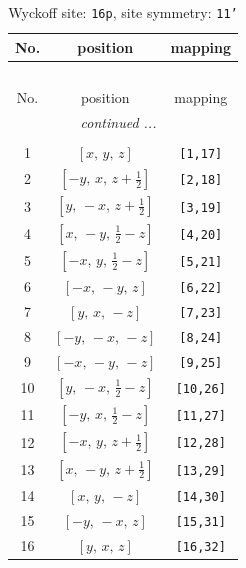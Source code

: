 \documentclass[fleqn,8pt]{jsarticle}
\begin{document}
\begin{longtable}{ccc}
\caption{Wyckoff site: {\tt 16p}, site symmetry: {\tt 11'}}
 \\
 \hline \hline
No. & position & mapping \\ \hline \endfirsthead

\multicolumn{2}{l}{\tablename\ \thetable{}} \\
 \hline \hline
No. & position & mapping \\ \hline \endhead

 \hline \hline
\multicolumn{2}{r}{\footnotesize\it continued ...} \\ \endfoot

 \hline \hline
\multicolumn{2}{r}{} \\ \endlastfoot

1 & $\left[ x,\, y,\, z \right]$ & {\tt [1,17]} \\ \hline
2 & $\left[ - y,\, x,\, z + \frac{1}{2} \right]$ & {\tt [2,18]} \\ \hline
3 & $\left[ y,\, - x,\, z + \frac{1}{2} \right]$ & {\tt [3,19]} \\ \hline
4 & $\left[ x,\, - y,\, \frac{1}{2} - z \right]$ & {\tt [4,20]} \\ \hline
5 & $\left[ - x,\, y,\, \frac{1}{2} - z \right]$ & {\tt [5,21]} \\ \hline
6 & $\left[ - x,\, - y,\, z \right]$ & {\tt [6,22]} \\ \hline
7 & $\left[ y,\, x,\, - z \right]$ & {\tt [7,23]} \\ \hline
8 & $\left[ - y,\, - x,\, - z \right]$ & {\tt [8,24]} \\ \hline
9 & $\left[ - x,\, - y,\, - z \right]$ & {\tt [9,25]} \\ \hline
10 & $\left[ y,\, - x,\, \frac{1}{2} - z \right]$ & {\tt [10,26]} \\ \hline
11 & $\left[ - y,\, x,\, \frac{1}{2} - z \right]$ & {\tt [11,27]} \\ \hline
12 & $\left[ - x,\, y,\, z + \frac{1}{2} \right]$ & {\tt [12,28]} \\ \hline
13 & $\left[ x,\, - y,\, z + \frac{1}{2} \right]$ & {\tt [13,29]} \\ \hline
14 & $\left[ x,\, y,\, - z \right]$ & {\tt [14,30]} \\ \hline
15 & $\left[ - y,\, - x,\, z \right]$ & {\tt [15,31]} \\ \hline
16 & $\left[ y,\, x,\, z \right]$ & {\tt [16,32]} \\
\end{longtable}
\end{document}
